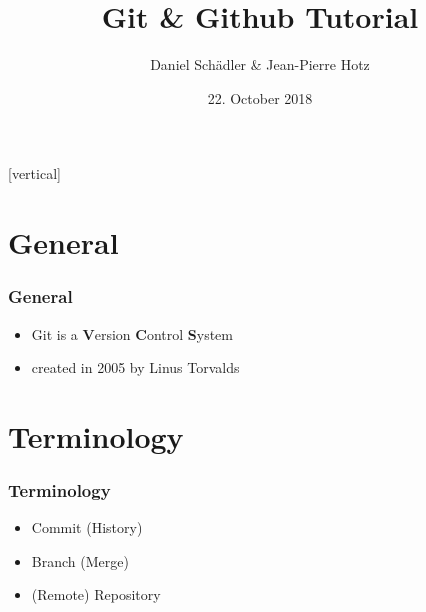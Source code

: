 \documentclass{beamer}
\begin{document}
	\title{Git \& Github Tutorial}   
	\author{Daniel Schädler \& Jean-Pierre Hotz} 
	\date{22. October 2018}
	
	\subtitle{} %
	\subject{Software-Engineering}%
	\keywords{}%
	
	[vertical]
	
	\begin{frame}
		\titlepage
	\end{frame}
	
	\begin{frame}
		\tableofcontents
	\end{frame}

	\section{General}
	\begin{frame}
		\frametitle{General}\pause
		\begin{itemize}
			\item Git is a \textbf{V}ersion \textbf{C}ontrol \textbf{S}ystem \pause
			\item created in 2005 by Linus Torvalds
		\end{itemize}
	\end{frame}

	\section{Terminology}
	\begin{frame}
		\frametitle{Terminology}\pause
		\begin{itemize}
			\item Commit (History) \pause
			\item Branch (Merge) \pause
			\item (Remote) Repository
		\end{itemize}
	\end{frame}
\end{document}
